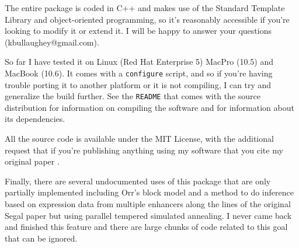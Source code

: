\documentclass[11pt]{article}
\begin{document}
The entire package is coded in C++ and makes use of the Standard Template Library and object-oriented programming, so it's reasonably accessible if you're looking to modify it or extend it. I will be happy to answer your questions (kbullaughey@gmail.com).

So far I have tested it on Linux (Red Hat Enterprise 5) MacPro (10.5) and MacBook (10.6). It comes with a \texttt{configure} script, and so if you're having trouble porting it to another platform or it is not compiling, I can try and generalize the build further. See the \texttt{README} that comes with the source distribution for information on compiling the software and for information about its dependencies.

All the source code is available under the MIT License, with the additional request that if you're publishing anything using my software that you cite my original paper \cite{Bullaughey:2011p6261}.

Finally, there are several undocumented uses of this package that are only partially implemented including Orr's block model and a method to do inference based on expression data from multiple enhancers along the lines of the original Segal paper but using parallel tempered simulated annealing. I never came back and finished this feature and there are large chunks of code related to this goal that can be ignored.


\end{document}
